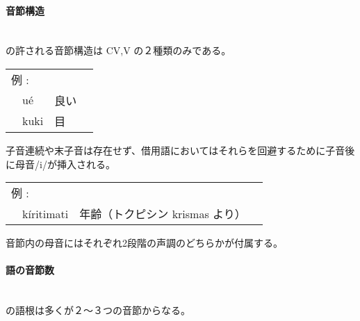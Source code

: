 \paragraph{音節構造}\quad\\
\langname の許される音節構造は CV,V の２種類のみである。

\begin{tabular}{llll}
    \multicolumn{2}{l}{例 : } \\ 
    & u\'e & 良い \\
    & kuki & 目 \\
\end{tabular}

子音連続や末子音は存在せず、借用語においてはそれらを回避するために子音後に母音/i/が挿入される。

\begin{tabular}{llll}
    \multicolumn{2}{l}{例 : } \\ 
    & k\'iritimati & 年齢（トクピシン krismas より） \\
\end{tabular}

音節内の母音にはそれぞれ2段階の声調のどちらかが付属する。

\paragraph{語の音節数}\quad\\
\langname の語根は多くが２～３つの音節からなる。


